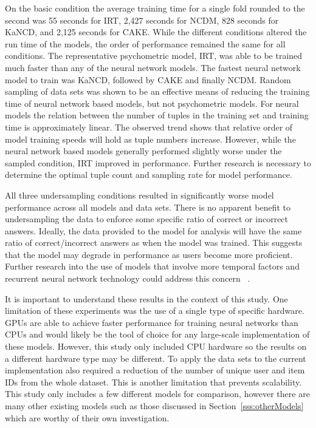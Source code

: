 \documentclass[letterpaper, 12pt, captions=tableabove]{scrreprt}
\begin{document}
	On the basic condition the average training time for a single fold rounded to the second was 55 seconds for IRT, 2,427 seconds for NCDM,  828 seconds for KaNCD, and 2,125 seconds for CAKE. While the different conditions altered the run time of the models, the order of performance remained the same for all conditions. The representative psychometric model, IRT, was able to be trained much faster than any of the neural network models. The fastest neural network model to train was KaNCD, followed by CAKE and finally NCDM. Random sampling of data sets was shown to be an effective means of reducing the training time of neural network based models, but not psychometric models. For neural models the relation between the number of tuples in the training set and training time is approximately linear. The observed trend shows that relative order of model training speeds will hold as tuple numbers increase. However, while the neural network based models generally performed slightly worse under the sampled condition, IRT improved in performance. Further research is necessary to determine the optimal tuple count and sampling rate for model performance.  

	All three undersampling conditions resulted in significantly worse model performance across all models and data sets. There is no apparent benefit to undersampling the data to enforce some specific ratio of correct or incorrect answers. Ideally, the data provided to the model for analysis will have the same ratio of correct/incorrect answers as when the model was trained. This suggests that the model may degrade in performance as users become more proficient. Further research into the use of models that involve more temporal factors and recurrent neural network technology could address this concern ~\cite{lyu2022}.

	It is important to understand these results in the context of this study. One limitation of these experiments was the use of a single type of specific hardware. GPUs are able to achieve faster performance for training neural networks than CPUs and would likely be the tool of choice for any large-scale implementation of these models. However, this study only included CPU hardware so the results on a different hardware type may be different. To apply the data sets to the current implementation also required a reduction of the number of unique user and item IDs from the whole dataset. This is another limitation that prevents scalability. This study only includes a few different models for comparison, however there are many other existing models such as those discussed in Section~\ref{sss:otherModels} which are worthy of their own investigation. 
\end{document}
